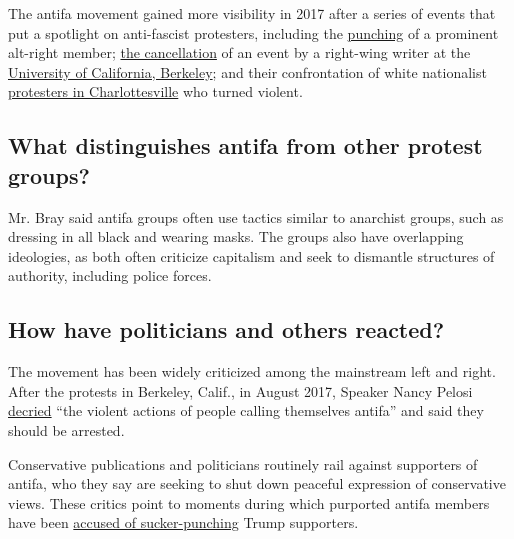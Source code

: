 The antifa movement gained more visibility in 2017 after a series of
events that put a spotlight on anti-fascist protesters, including the
\href{https://www.nytimes3xbfgragh.onion/2017/01/21/us/politics/richard-spencer-punched-attack.html}{punching}
of a prominent alt-right member;
\href{https://www.nytimes3xbfgragh.onion/2017/02/02/us/university-california-berkeley-free-speech-milo-yiannopoulos.html}{the
cancellation} of an event by a right-wing writer at the
\href{https://www.nytimes3xbfgragh.onion/2017/02/02/us/university-california-berkeley-free-speech-milo-yiannopoulos.html}{University
of California, Berkeley}; and their confrontation of white nationalist
\href{https://www.nytimes3xbfgragh.onion/2017/08/14/us/who-were-the-counterprotesters-in-charlottesville.html}{protesters
in Charlottesville} who turned violent.

\hypertarget{what-distinguishes-antifa-from-other-protest-groups}{%
\subsection{What distinguishes antifa from other protest
groups?}\label{what-distinguishes-antifa-from-other-protest-groups}}

Mr. Bray said antifa groups often use tactics similar to anarchist
groups, such as dressing in all black and wearing masks. The groups also
have overlapping ideologies, as both often criticize capitalism and seek
to dismantle structures of authority, including police forces.

\hypertarget{how-have-politicians-and-others-reacted}{%
\subsection{How have politicians and others
reacted?}\label{how-have-politicians-and-others-reacted}}

The movement has been widely criticized among the mainstream left and
right. After the protests in Berkeley, Calif., in August 2017, Speaker
Nancy Pelosi \href{https://www.speaker.gov/newsroom/82917/}{decried}
``the violent actions of people calling themselves antifa'' and said
they should be arrested.

Conservative publications and politicians routinely rail against
supporters of antifa, who they say are seeking to shut down peaceful
expression of conservative views. These critics point to moments during
which purported antifa members have been
\href{https://www.washingtonpost.com/news/post-nation/wp/2017/08/25/a-trump-supporter-was-sucker-punched-by-a-counterprotester-why-isnt-it-a-hate-crime/?utm_term=.9ddfb2a40d3a}{accused
of sucker-punching} Trump supporters.

